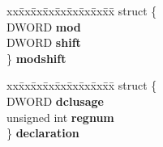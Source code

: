 \begin{DoxyCompactItemize}
\begin{tabbing}
\end{tabbing}\item 
\mbox{\label{union_y_y_s_t_y_p_e_a931b6c0f3995826b010797afd510b15b}} 
\begin{tabbing}
xx\=xx\=xx\=xx\=xx\=xx\=xx\=xx\=xx\=\kill
struct \{\\
\>DWORD {\bfseries mod}\\
\>DWORD {\bfseries shift}\\
\} {\bfseries modshift}\\

\end{tabbing}\item 
\mbox{\label{union_y_y_s_t_y_p_e_a4d177e56f549ebd7a56a39606d3ddb87}} 
\begin{tabbing}
xx\=xx\=xx\=xx\=xx\=xx\=xx\=xx\=xx\=\kill
struct \{\\
\>DWORD {\bfseries dclusage}\\
\>unsigned int {\bfseries regnum}\\
\} {\bfseries declaration}\\


\end{tabbing}
\end{DoxyCompactItemize}
